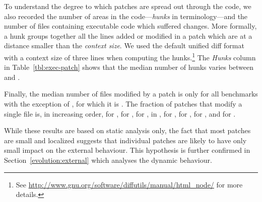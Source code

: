 
To understand the degree to which patches are spread out through the
code, we also recorded the number of areas in the
code---\textit{hunks} in \git terminology---and the number of files
containing executable code which suffered changes.  More formally, a
hunk groups together all the lines added or modified in a patch which
are at a distance smaller than the \textit{context size}.  We used the
default unified diff format with a context size of three lines when
computing the
hunks.\footnote{See \url{http://www.gnu.org/software/diffutils/manual/html_node/}
for more details.}  The \textit{Hunks} column in
Table~\ref{tbl:exec-patch} shows that the median number of hunks
varies between \binutilseHunkThreeMedian and \zeromqeHunkThreeMedian.

Finally, the median number of files modified by a patch is
only \rediseFileMedian for all benchmarks with the exception
of \zeromq, for which it is \zeromqeFileMedian. The fraction of
patches that modify a single file is, in increasing
order, \vimOneeFilePatches for \vim, \zeromqOneeFilePatches for \zeromq,
\gitOneeFilePatches for \git, \beanstalkdOneeFilePatches in \beanstalkd,
\lighttpdtwoOneeFilePatches for \lighttpdtwo, \memcachedOneeFilePatches for
\memcached, \redisOneeFilePatches for \redis, and \binutilsOneeFilePatches for
\binutils.

While these results are based on static analysis only, the fact that most
patches are small and localized suggests that individual patches are likely to
have only small impact on the external behaviour. This hypothesis is further
confirmed in Section~\ref{evolution:external} which analyses the dynamic
behaviour.


